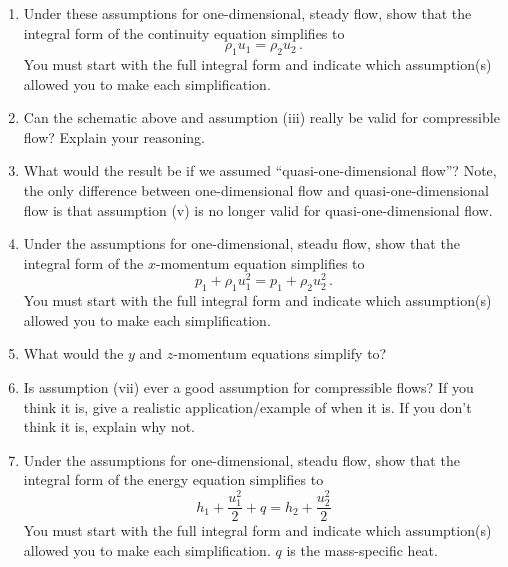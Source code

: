 \documentclass[../main.tex]{subfiles}
\begin{document}
\begin{enumerate}[label = (\alph*)]

    \item 
        Under these assumptions for one-dimensional, steady flow, show that the integral form of the continuity equation simplifies to
        \[
            \rho_1 u_1 = \rho_2 u_2 \, .  
        \]
        You must start with the full integral form and indicate which assumption(s) allowed you to make each simplification.
   
    \item 
        Can the schematic above and assumption (iii) really be valid for compressible flow?
        Explain your reasoning.

    \item 
        What would the result be if we assumed ``quasi-one-dimensional flow''?
        Note, the only difference between one-dimensional flow and quasi-one-dimensional flow is that assumption (v) is no longer valid for quasi-one-dimensional flow.

    \item
        Under the assumptions for one-dimensional, steadu flow, show that the integral form of the $x$-momentum equation simplifies to
        \[
            p_1 + \rho_1 u_1^2 = p_1 + \rho_2 u_2^2 \, .
        \]
        You must start with the full integral form and indicate which assumption(s) allowed you to make each simplification.

    \item
        What would the $y$ and $z$-momentum equations simplify to?

    \item
        Is assumption (vii) ever a good assumption for compressible flows?
        If you think it is, give a realistic application/example of when it is.
        If you don't think it is, explain why not.

    \item
        Under the assumptions for one-dimensional, steadu flow, show that the integral form of the energy equation simplifies to
        \[
            h_1 + \frac{u_1^2}{2} + q = h_2 + \frac{u_2^2}{2}  
        \]
        You must start with the full integral form and indicate which assumption(s) allowed you to make each simplification.
        $q$ is the mass-specific heat.
        
\end{enumerate}
\end{document}
